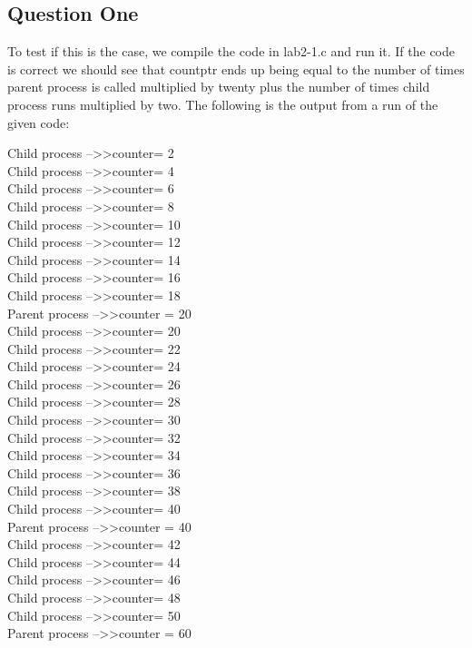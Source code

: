\documentclass[12pt, titlepage]{article}
\begin{document}
\subsection*{Question One}
\par{} 
To test if this is the case, we compile the code in lab2-1.c and run it. 
If the code is correct we should see that countptr ends up being equal to
the number of times parent process is called multiplied by twenty plus the number 
of times child process runs multiplied by two.
The following is the output from a run of the given code:
\begin{center}
	Child process --\textgreater\textgreater counter= 2\\
Child process --\textgreater\textgreater counter= 4\\
Child process --\textgreater\textgreater counter= 6\\
Child process --\textgreater\textgreater counter= 8\\
Child process --\textgreater\textgreater counter= 10\\
Child process --\textgreater\textgreater counter= 12\\
Child process --\textgreater\textgreater counter= 14\\
Child process --\textgreater\textgreater counter= 16\\
Child process --\textgreater\textgreater counter= 18\\
Parent process --\textgreater\textgreater counter = 20\\
Child process --\textgreater\textgreater counter= 20\\
Child process --\textgreater\textgreater counter= 22\\
Child process --\textgreater\textgreater counter= 24\\
Child process --\textgreater\textgreater counter= 26\\
Child process --\textgreater\textgreater counter= 28\\
Child process --\textgreater\textgreater counter= 30\\
Child process --\textgreater\textgreater counter= 32\\
Child process --\textgreater\textgreater counter= 34\\
Child process --\textgreater\textgreater counter= 36\\
Child process --\textgreater\textgreater counter= 38\\
Child process --\textgreater\textgreater counter= 40\\
Parent process --\textgreater\textgreater counter = 40\\
Child process --\textgreater\textgreater counter= 42\\
Child process --\textgreater\textgreater counter= 44\\
Child process --\textgreater\textgreater counter= 46\\
Child process --\textgreater\textgreater counter= 48\\
Child process --\textgreater\textgreater counter= 50\\
Parent process --\textgreater\textgreater counter = 60\\
\end{center}
\end{document}
